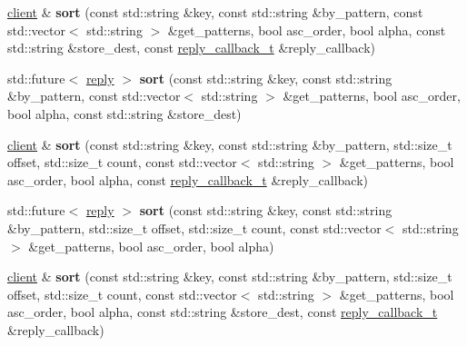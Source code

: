 \begin{DoxyCompactItemize}
\hyperlink{classcpp__redis_1_1client}{client} \& {\bfseries sort} (const std\+::string \&key, const std\+::string \&by\+\_\+pattern, const std\+::vector$<$ std\+::string $>$ \&get\+\_\+patterns, bool asc\+\_\+order, bool alpha, const std\+::string \&store\+\_\+dest, const \hyperlink{classcpp__redis_1_1client_a061a1140d36d2eaeda82b09a0bb3f9f2}{reply\+\_\+callback\+\_\+t} \&reply\+\_\+callback)
\item 
\mbox{\label{classcpp__redis_1_1client_aa4b367d9b16d363883ee68f56b1b3763}} 
std\+::future$<$ \hyperlink{classcpp__redis_1_1reply}{reply} $>$ {\bfseries sort} (const std\+::string \&key, const std\+::string \&by\+\_\+pattern, const std\+::vector$<$ std\+::string $>$ \&get\+\_\+patterns, bool asc\+\_\+order, bool alpha, const std\+::string \&store\+\_\+dest)
\item 
\mbox{\label{classcpp__redis_1_1client_af962a79e0adec8e8e5e2e1d512be9a80}} 
\hyperlink{classcpp__redis_1_1client}{client} \& {\bfseries sort} (const std\+::string \&key, const std\+::string \&by\+\_\+pattern, std\+::size\+\_\+t offset, std\+::size\+\_\+t count, const std\+::vector$<$ std\+::string $>$ \&get\+\_\+patterns, bool asc\+\_\+order, bool alpha, const \hyperlink{classcpp__redis_1_1client_a061a1140d36d2eaeda82b09a0bb3f9f2}{reply\+\_\+callback\+\_\+t} \&reply\+\_\+callback)
\item 
\mbox{\label{classcpp__redis_1_1client_afb923134bf1b936da3c01938db57af30}} 
std\+::future$<$ \hyperlink{classcpp__redis_1_1reply}{reply} $>$ {\bfseries sort} (const std\+::string \&key, const std\+::string \&by\+\_\+pattern, std\+::size\+\_\+t offset, std\+::size\+\_\+t count, const std\+::vector$<$ std\+::string $>$ \&get\+\_\+patterns, bool asc\+\_\+order, bool alpha)
\item 
\mbox{\label{classcpp__redis_1_1client_a251ad8183423ad67f830e68a558ec488}} 
\hyperlink{classcpp__redis_1_1client}{client} \& {\bfseries sort} (const std\+::string \&key, const std\+::string \&by\+\_\+pattern, std\+::size\+\_\+t offset, std\+::size\+\_\+t count, const std\+::vector$<$ std\+::string $>$ \&get\+\_\+patterns, bool asc\+\_\+order, bool alpha, const std\+::string \&store\+\_\+dest, const \hyperlink{classcpp__redis_1_1client_a061a1140d36d2eaeda82b09a0bb3f9f2}{reply\+\_\+callback\+\_\+t} \&reply\+\_\+callback)

\end{DoxyCompactItemize}
